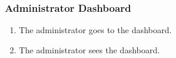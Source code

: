 \subsubsection{Administrator Dashboard}

\begin{enumerate}
    \item The administrator goes to the dashboard.
    \item The administrator sees the dashboard.
\end{enumerate}
